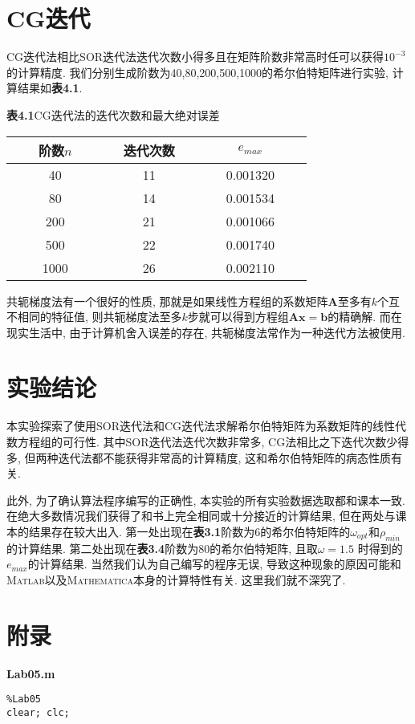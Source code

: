 \documentclass[a4paper,12pt]{article}
\begin{document}
\begin{CJK*}{UTF8}{gbsn}
\section{CG迭代}
CG迭代法相比SOR迭代法迭代次数小得多且在矩阵阶数非常高时任可以获得$10^{-3}$的计算精度. 我们分别生成阶数为40,80,200,500,1000的希尔伯特矩阵进行实验, 计算结果如\textbf{表4.1}.
\begin{center}
\textbf{表4.1}\quad CG迭代法的迭代次数和最大绝对误差\\\vspace{2pt}
\begin{tabular}{ccccccccccccc}
\toprule[1.5pt]
&& 阶数$n$ &&&& 迭代次数 &&&& $e_{max}$ &&\\
\midrule[1.5pt]
&& 40 &&&& 11 &&&& 0.001320 &&\\
&& 80 &&&& 14 &&&& 0.001534 &&\\
&& 200 &&&& 21 &&&& 0.001066 &&\\
&& 500 &&&& 22 &&&& 0.001740 &&\\
&& 1000 &&&& 26 &&&& 0.002110 &&\\
\bottomrule[1.5pt]
\end{tabular}
\end{center}\par
共轭梯度法有一个很好的性质, 那就是如果线性方程组的系数矩阵$\bm{A}$至多有$k$个互不相同的特征值, 则共轭梯度法至多$k$步就可以得到方程组$\bm{Ax}=\bm{b}$的精确解. 而在现实生活中, 由于计算机舍入误差的存在, 共轭梯度法常作为一种迭代方法被使用.


\section{实验结论}
本实验探索了使用SOR迭代法和CG迭代法求解希尔伯特矩阵为系数矩阵的线性代数方程组的可行性. 其中SOR迭代法迭代次数非常多, CG法相比之下迭代次数少得多, 但两种迭代法都不能获得非常高的计算精度, 这和希尔伯特矩阵的病态性质有关.\par
此外, 为了确认算法程序编写的正确性, 本实验的所有实验数据选取都和课本一致. 在绝大多数情况我们获得了和书上完全相同或十分接近的计算结果, 但在两处与课本的结果存在较大出入. 第一处出现在\textbf{表3.1}阶数为6的希尔伯特矩阵的$\omega_{opt}$和$\rho_{min}$的计算结果. 第二处出现在\textbf{表3.4}阶数为80的希尔伯特矩阵, 且取$\omega=1.5$ 时得到的$e_{max}$的计算结果. 当然我们认为自己编写的程序无误, 导致这种现象的原因可能和\textsc{Matlab}以及\textsc{Mathematica}本身的计算特性有关. 这里我们就不深究了.

\section{附录}
\noindent\textbf{Lab05.m}
\vspace{-15pt}
\lstset{basicstyle=\ttfamily\footnotesize,escapechar=`}
\begin{lstlisting}
%Lab05
clear; clc;


\end{lstlisting}
\end{CJK*}
\end{document}

